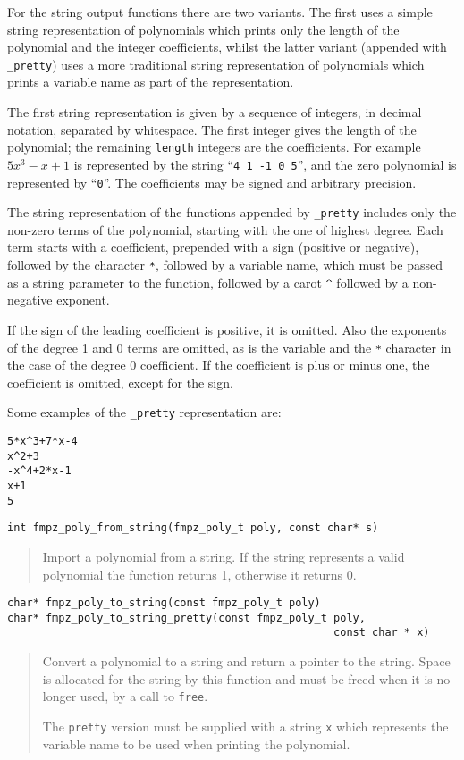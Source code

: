 \documentclass[a4paper,10pt]{article}
\newcommand{\code}{\lstinline}
\begin{document}
For the string output functions there are two variants. The first uses a simple string representation of polynomials which prints only the length of the polynomial and the integer coefficients, whilst the latter variant (appended with \code{_pretty}) uses a more traditional string representation of polynomials which prints a variable name as part of the representation. 

The first string representation is given by a sequence of integers, in decimal notation, separated by whitespace. The first integer gives the length of the polynomial; the remaining \code{length} integers are the coefficients. For example $5x^3 - x + 1$ is represented by the string ``\code{4 1 -1 0 5}'', and the zero polynomial is represented by ``\code{0}''. The coefficients may be signed and arbitrary precision.

The string representation of the functions appended by \code{_pretty} includes only the non-zero terms of the polynomial, starting with the one of highest degree. Each term starts with a coefficient, prepended with a sign (positive or negative), followed by the character \code{*}, followed by a variable name, which must be passed as a string parameter to the function, followed by a carot \code{^} followed by a non-negative exponent.

If the sign of the leading coefficient is positive, it is omitted. Also the exponents of the degree 1 and 0 terms are omitted, as is the variable and the \code{*} character in the case of the degree 0 coefficient. If the coefficient is plus or minus one, the coefficient is omitted, except for the sign.

Some examples of the \code{_pretty} representation are:

\begin{lstlisting}
5*x^3+7*x-4
x^2+3
-x^4+2*x-1
x+1
5
\end{lstlisting}

\begin{lstlisting}
int fmpz_poly_from_string(fmpz_poly_t poly, const char* s)
\end{lstlisting}
\begin{quote}
Import a polynomial from a string. If the string represents a valid polynomial the function returns 1, otherwise it returns 0.
\end{quote}

\begin{lstlisting}
char* fmpz_poly_to_string(const fmpz_poly_t poly)
char* fmpz_poly_to_string_pretty(const fmpz_poly_t poly, 
                                                   const char * x)
\end{lstlisting}
\begin{quote}
Convert a polynomial to a string and return a pointer to the string. Space is allocated for the string by this function and must be freed when it is no longer used, by a call to \code{free}.

The \code{pretty} version must be supplied with a string \code{x} which represents the variable name to be used when printing the polynomial.
\end{quote}
\end{document}
